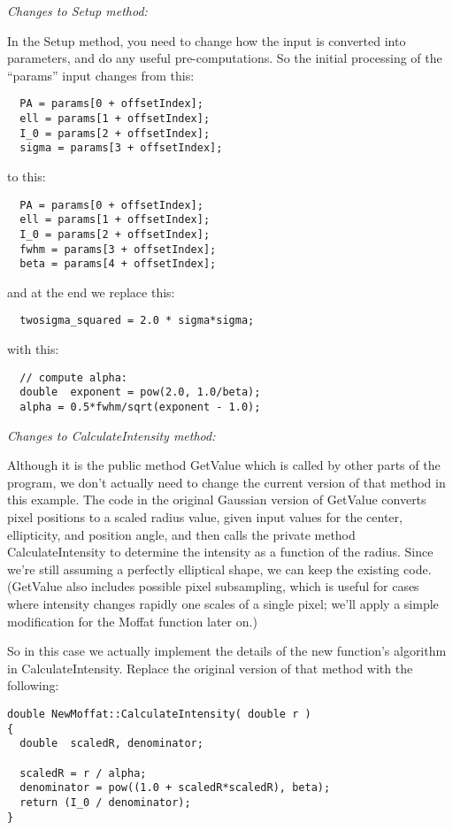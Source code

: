 \documentclass[10pt,a4paper,article]{memoir}
\begin{document}
\bigskip
\noindent \textit{Changes to Setup method:}
\smallskip

In the Setup method, you need to change how the input is converted into
parameters, and do any useful pre-computations. So the initial processing of
the ``params'' input changes from this:
\begin{verbatim}
  PA = params[0 + offsetIndex];
  ell = params[1 + offsetIndex];
  I_0 = params[2 + offsetIndex];
  sigma = params[3 + offsetIndex];
\end{verbatim}

to this:
\begin{verbatim}
  PA = params[0 + offsetIndex];
  ell = params[1 + offsetIndex];
  I_0 = params[2 + offsetIndex];
  fwhm = params[3 + offsetIndex];
  beta = params[4 + offsetIndex];
\end{verbatim}
and at the end we replace this:
\begin{verbatim}
  twosigma_squared = 2.0 * sigma*sigma;
\end{verbatim}
with this:
\begin{verbatim}
  // compute alpha:
  double  exponent = pow(2.0, 1.0/beta);
  alpha = 0.5*fwhm/sqrt(exponent - 1.0);
\end{verbatim}


\bigskip
\noindent \textit{Changes to CalculateIntensity method:}
\smallskip

Although it is the public method GetValue which is called by other parts of
the program, we don't actually need to change the current version of that method
in this example. The code in the original Gaussian version of GetValue
converts pixel positions to a scaled radius value, given input values for
the center, ellipticity, and position angle, and then calls the private method
CalculateIntensity to determine the intensity as a function of the radius.
Since we're still assuming a perfectly elliptical shape, we can keep the
existing code. (GetValue also includes possible pixel subsampling, which
is useful for cases where intensity changes rapidly one scales of a single pixel;
we'll apply a simple modification for the Moffat function later on.)

So in this case we actually implement the details of the new function's algorithm in
CalculateIntensity. Replace the original version of that method with the
following:

\begin{verbatim}
double NewMoffat::CalculateIntensity( double r )
{
  double  scaledR, denominator;
  
  scaledR = r / alpha;
  denominator = pow((1.0 + scaledR*scaledR), beta);
  return (I_0 / denominator);
}
\end{verbatim}
\end{document}
